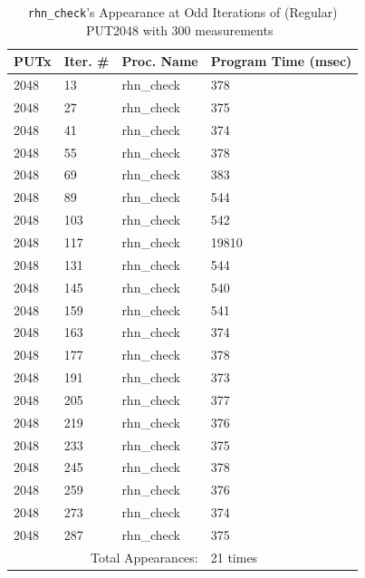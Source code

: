 \documentclass[10pt]{article}
\begin{document}
\begin{table}[htp!]
\centering
{
 \begin{tabular}{|l|l|l|l|} \hline
PUTx & Iter. \# & Proc. Name & Program Time (msec)\\ \hline
2048 & 13 & rhn\_check & 378 \\ \hline
2048 & 27 & rhn\_check & 375 \\ \hline
2048 & 41 & rhn\_check & 374 \\ \hline
2048 & 55 & rhn\_check & 378 \\ \hline
2048 & 69 & rhn\_check & 383 \\ \hline
2048 & 89 & rhn\_check & 544 \\ \hline
2048 & 103 & rhn\_check & 542 \\ \hline
2048 & 117 & rhn\_check & 19810 \\ \hline
2048 & 131 & rhn\_check & 544 \\ \hline
2048 & 145 & rhn\_check & 540 \\ \hline
2048 & 159 & rhn\_check & 541 \\ \hline
2048 & 163 & rhn\_check & 374 \\ \hline
2048 & 177 & rhn\_check & 378 \\ \hline
2048 & 191 & rhn\_check & 373 \\ \hline
2048 & 205 & rhn\_check & 377 \\ \hline
2048 & 219 & rhn\_check & 376 \\ \hline
2048 & 233 & rhn\_check & 375 \\ \hline
2048 & 245 & rhn\_check & 378 \\ \hline
2048 & 259 & rhn\_check & 376 \\ \hline
2048 & 273 & rhn\_check & 374 \\ \hline
2048 & 287 & rhn\_check & 375 \\ \hline
\multicolumn{3}{|r|}{Total Appearances:} & 21 times\\ \hline
  \end{tabular}
  }
 \caption{{\tt rhn\_check}'s Appearance at Odd Iterations of (Regular) PUT2048 with 300 measurements~\label{fig:rc_reg_put_2048_odd}}
\end{table}
\end{document}

